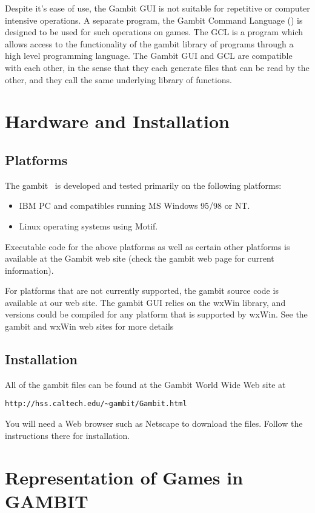 Despite it's ease of use, the Gambit GUI is not suitable for repetitive or
computer intensive  operations.  A separate program, the Gambit Command
Language () is designed to be used for such operations 
on games.  The
GCL is a program which allows access to the functionality of the gambit
library of programs through a high level programming language.  The
Gambit GUI and GCL  are compatible with each other, in the sense that they
each generate files that can be read by the other, and they call the same
underlying library of functions.


\chapter{Hardware and Installation}
\section{Platforms}
The gambit \ is developed and tested primarily
on the following platforms:
\begin{itemize}
\item IBM PC and compatibles running MS Windows 95/98 or NT.
\item Linux operating systems using Motif. 
\end{itemize}

Executable code for the above platforms as well as certain other
platforms is available at the Gambit web site (check the gambit web
page for current information).

For platforms that are not currently supported, the gambit source code
is available at our web site.  The gambit GUI relies on the wxWin
library, and versions could be compiled for any platform that is
supported by wxWin.  See the gambit and wxWin web sites for more
details

\section{Installation}
All of the gambit files can be found at the Gambit World Wide Web site
at 

\begin{verbatim}
http://hss.caltech.edu/~gambit/Gambit.html
\end{verbatim}

You will need a Web browser such as Netscape to download the files.  Follow the 
instructions there for installation.  
 
\chapter{Representation of Games in GAMBIT}

